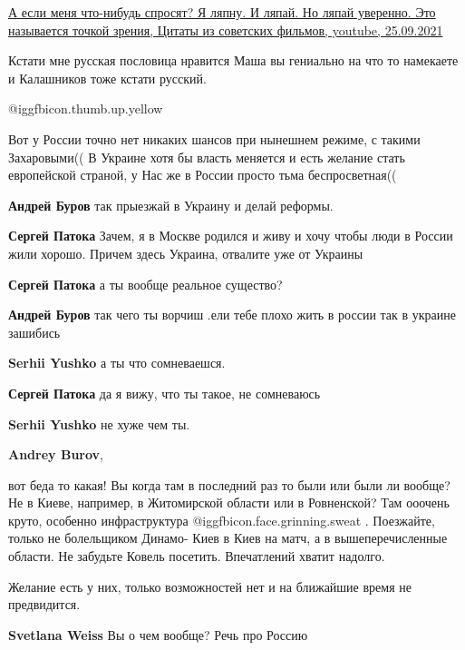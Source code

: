 \begin{itemize}

\href{https://youtu.be/wiEM8HrjuII}{%
А если меня что-нибудь спросят? Я ляпну. И ляпай. Но ляпай уверенно. Это называется точкой зрения, %
Цитаты из советских фильмов, youtube, 25.09.2021%
}


Кстати мне русская пословица нравится Маша вы гениально на что то намекаете и
Калашников тоже кстати русский.

 @igg{fbicon.thumb.up.yellow} 


Вот у России точно нет никаких шансов при нынешнем режиме, с такими
Захаровыми(( В Украине хотя бы власть меняется и есть желание стать европейской
страной, у Нас же в России просто тьма беспросветная((

\begin{itemize} %
\textbf{Андрей Буров} так прыезжай в Украину и делай реформы.

\textbf{Сергей Патока} Зачем, я в Москве родился и живу и хочу чтобы люди в России жили хорошо. Причем здесь Украина, отвалите уже от Украины

\textbf{Сергей Патока} а ты вообще реальное существо?

\textbf{Андрей Буров} так чего ты ворчиш .ели тебе плохо жить в россии так в украине зашибись

\textbf{Serhii Yushko} а ты что сомневаешся.

\textbf{Сергей Патока} да я вижу, что ты такое, не сомневаюсь

\textbf{Serhii Yushko} не хуже чем ты.

\textbf{Andrey Burov}, 

вот беда то какая! Вы когда там в последний раз то были или были ли вообще? Не
в Киеве, например, в Житомирской области или в Ровненской? Там ооочень круто,
особенно инфраструктура  @igg{fbicon.face.grinning.sweat} . Поезжайте, только не болельщиком Динамо- Киев в
Киев на матч, а в вышеперечисленные области. Не забудьте Ковель посетить.
Впечатлений хватит надолго.

Желание есть у них, только возможностей нет и на ближайшие время не
предвидится.

\textbf{Svetlana Weiss} Вы о чем вообще? Речь про Россию


\end{itemize}
\end{itemize}
